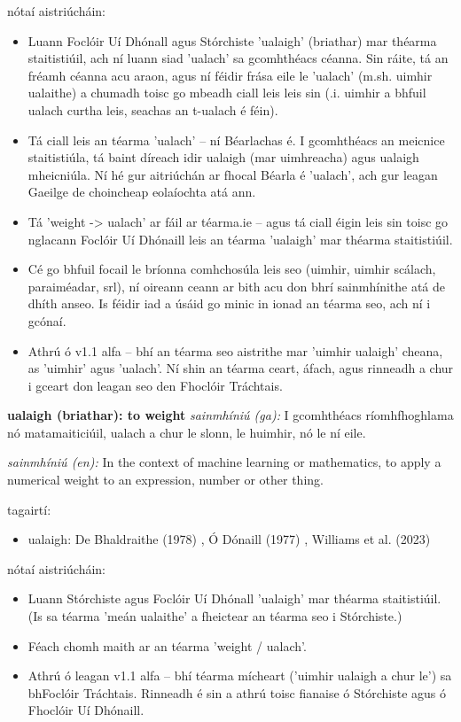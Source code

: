 \documentclass{article}
\begin{document}
nótaí aistriúcháin:
\begin{itemize}
	\item Luann Foclóir Uí Dhónall agus Stórchiste 'ualaigh' (briathar) mar théarma staitistiúil, ach ní luann siad 'ualach' sa gcomhthéacs céanna. Sin ráite, tá an fréamh céanna acu araon, agus ní féidir frása eile le 'ualach' (m.sh. uimhir ualaithe) a chumadh toisc go mbeadh ciall leis leis sin (.i. uimhir a bhfuil ualach curtha leis, seachas an t-ualach é féin).
	\item Tá ciall leis an téarma 'ualach' -- ní Béarlachas é. I gcomhthéacs an meicnice staitistiúla, tá baint díreach idir ualaigh (mar uimhreacha) agus ualaigh mheicniúla. Ní hé gur aitriúchán ar fhocal Béarla é 'ualach', ach gur leagan Gaeilge de choincheap eolaíochta atá ann.
	\item Tá 'weight -> ualach' ar fáil ar téarma.ie -- agus tá ciall éigin leis sin toisc go nglacann Foclóir Uí Dhónaill leis an téarma 'ualaigh' mar théarma staitistiúil. 
	\item Cé go bhfuil focail le bríonna comhchosúla leis seo (uimhir, uimhir scálach, paraiméadar, srl), ní oireann ceann ar bith acu don bhrí sainmhínithe atá de dhíth anseo. Is féidir iad a úsáid go minic in ionad an téarma seo, ach ní i gcónaí.
	\item Athrú ó v1.1 alfa -- bhí an téarma seo aistrithe mar 'uimhir ualaigh' cheana, as 'uimhir' agus 'ualach'. Ní shin an téarma ceart, áfach, agus rinneadh a chur i gceart don leagan seo den Fhoclóir Tráchtais.
\end{itemize}


\textbf{ualaigh (briathar): to weight}
\textit{sainmhíniú (ga):} I gcomhthéacs ríomhfhoghlama nó matamaiticiúil, ualach a chur le slonn, le huimhir, nó le ní eile.

\textit{sainmhíniú (en):} In the context of machine learning or mathematics, to apply a numerical weight to an expression, number or other thing.

tagairtí:
\begin{itemize}
	\item ualaigh: De Bhaldraithe (1978) \cite{de-bhaldraithe}, Ó Dónaill (1977) \cite{odonaill}, Williams et al. (2023) \cite{storchiste}
\end{itemize}

nótaí aistriúcháin:
\begin{itemize}
	\item Luann Stórchiste agus Foclóir Uí Dhónall 'ualaigh' mar théarma staitistiúil. (Is sa téarma 'meán ualaithe' a fheictear an téarma seo i Stórchiste.)
	\item Féach chomh maith ar an téarma 'weight / ualach'.
	\item Athrú ó leagan v1.1 alfa -- bhí téarma mícheart ('uimhir ualaigh a chur le') sa bhFoclóir Tráchtais. Rinneadh é sin a athrú toisc fianaise ó Stórchiste agus ó Fhoclóir Uí Dhónaill.
\end{itemize}
\end{document}
